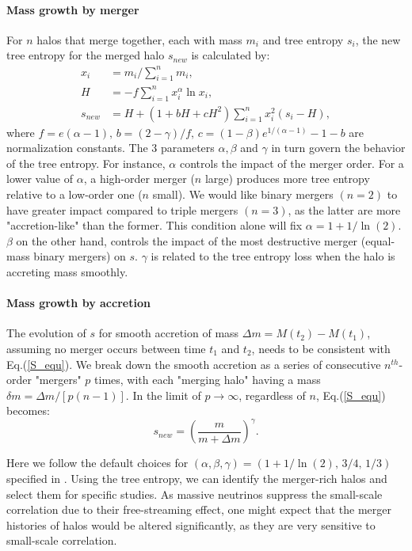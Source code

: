 \paragraph{Mass growth by merger} For $n$ halos that merge together, each with mass $m_i$ and tree entropy $s_i$, the new tree entropy for the merged halo $s_{new}$ is calculated by:
\begin{subequations}
\label{S_equ}
\begin{align}
    x_i &= m_i/ \sum_{i=1}^n m_i ,\\
    H &= -f \sum_{i=1}^n x^\alpha_i \ln{x_i} , \\
    s_{new} &= H + (1+bH+cH^2) \sum_{i=1}^n x^2_i(s_i - H),
\end{align}
\end{subequations}
where $f=e(\alpha-1),\, b=(2-\gamma)/f,\, c= (1-\beta)e^{1/(\alpha-1)}-1-b$ are normalization constants. The 3 parameters $\alpha, \beta$ and $\gamma$ in turn govern the behavior of the tree entropy. For instance, $\alpha$ controls the impact of the merger order.
For a lower value of $\alpha$, a high-order merger ($n$ large) produces more tree entropy relative to a low-order one ($n$ small).
We would like binary mergers $(n=2)$ to have greater impact compared to triple mergers $(n=3)$, as the latter are more "accretion-like" than the former. This condition alone will fix $\alpha=1+ 1/ \ln(2)$.
$\beta$ on the other hand, controls the impact of the most destructive merger (equal-mass binary mergers) on $s$. $\gamma$ is related to the tree entropy loss when the halo is accreting mass smoothly.


\paragraph{Mass growth by accretion} 
The evolution of $s$ for smooth accretion of mass $\Delta m = M(t_2) - M(t_1)$, assuming no merger occurs between time $t_1$ and $t_2$, needs to be consistent with Eq.(\ref{S_equ}). We break down the smooth accretion as a series of consecutive $n^{th}$-order "mergers" $p$ times, with each "merging halo" having a mass $\delta m = \Delta m/[p(n-1)]$. In the limit of $p \to \infty$, regardless of $n$, Eq.(\ref{S_equ}) becomes:
\begin{equation}
    s_{new} = \left( \frac{m}{m+\Delta m} \right) ^\gamma.
\end{equation}


Here we follow the default choices for $(\alpha,\beta,\gamma)=(1+1/ \ln(2),\, 3/4,\, 1/3)$ specified in \cite{tree entropy}.
Using the tree entropy, we can identify the merger-rich halos and select them for specific studies.
As massive neutrinos suppress the small-scale correlation due to their free-streaming effect, one might expect that the merger histories of halos would be altered significantly, as they are very sensitive to small-scale correlation. 

